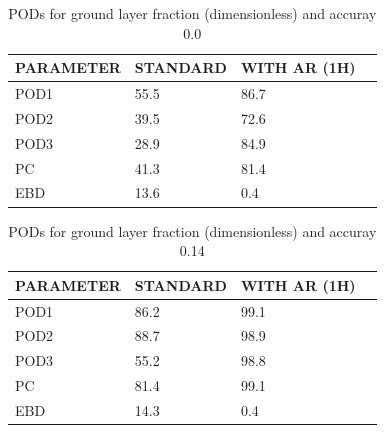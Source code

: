 \documentclass[a4paper,english]{article}
\begin{document}
\begin{table}[]
\begin{center}
\begin{tabular}{|l|l|l|l|}
\hline
\multicolumn{1}{|c|}{\cellcolor[HTML]{C0C0C0}\textbf{PARAMETER}} & \multicolumn{1}{c|}{\cellcolor[HTML]{C0C0C0}\textbf{STANDARD}} & \multicolumn{1}{c|}{\cellcolor[HTML]{C0C0C0}\textbf{WITH AR (1H)}} \\
\hline
\cellcolor[HTML]{C0C0C0}POD1  & 55.5                                & 86.7         \\
\cellcolor[HTML]{C0C0C0}POD2  & 39.5                                & 72.6         \\
\cellcolor[HTML]{C0C0C0}POD3  & 28.9                                & 84.9         \\
\cellcolor[HTML]{C0C0C0}PC    & 41.3                                  & 81.4           \\
\cellcolor[HTML]{C0C0C0}EBD   & 13.6                                 & 0.4          \\
\hline
\end{tabular}
\caption{PODs for ground layer fraction (dimensionless) and accuray 0.0}
\end{center}
\end{table}
\begin{table}[]
\begin{center}
\begin{tabular}{|l|l|l|l|}
\hline
\multicolumn{1}{|c|}{\cellcolor[HTML]{C0C0C0}\textbf{PARAMETER}} & \multicolumn{1}{c|}{\cellcolor[HTML]{C0C0C0}\textbf{STANDARD}} & \multicolumn{1}{c|}{\cellcolor[HTML]{C0C0C0}\textbf{WITH AR (1H)}} \\
\hline
\cellcolor[HTML]{C0C0C0}POD1  & 86.2                                & 99.1         \\
\cellcolor[HTML]{C0C0C0}POD2  & 88.7                                & 98.9         \\
\cellcolor[HTML]{C0C0C0}POD3  & 55.2                                & 98.8         \\
\cellcolor[HTML]{C0C0C0}PC    & 81.4                                  & 99.1           \\
\cellcolor[HTML]{C0C0C0}EBD   & 14.3                                 & 0.4          \\
\hline
\end{tabular}
\caption{PODs for ground layer fraction (dimensionless) and accuray 0.14}
\end{center}
\end{table}
\end{document}
